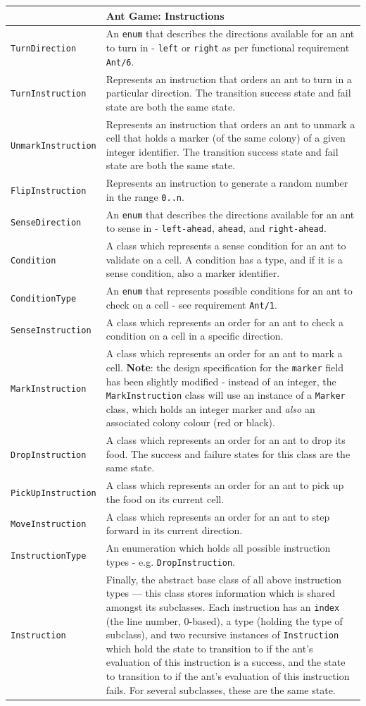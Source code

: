 \documentclass[11pt]{article}
\begin{document}
\begin{longtable}[c]{@{}p{}p{}@{}}
\toprule
& Ant Game: Instructions\tabularnewline
\midrule

\texttt{TurnDirection} & An \texttt{enum} that describes the directions available for an ant to turn in - \texttt{left} or \texttt{right} as per functional requirement \texttt{Ant/6}. \tabularnewline
\texttt{TurnInstruction} & Represents an instruction that orders an ant to turn in a particular direction. The transition success state and fail state are both the same state. \tabularnewline
\texttt{UnmarkInstruction} & Represents an instruction that orders an ant to unmark a cell that holds a marker (of the same colony) of a given integer identifier. The transition success state and fail state are both the same state. \tabularnewline
\texttt{FlipInstruction} & Represents an instruction to generate a random number in the range \texttt{0..n}. \tabularnewline
\texttt{SenseDirection} & An \texttt{enum} that describes the directions available for an ant to sense in - \texttt{left-ahead}, \texttt{ahead}, and \texttt{right-ahead}. \tabularnewline
\texttt{Condition} & A class which represents a sense condition for an ant to validate on a cell. A condition has a type, and if it is a sense condition, also a marker identifier. \tabularnewline
\texttt{ConditionType} & An \texttt{enum} that represents possible conditions for an ant to check on a cell - see requirement \texttt{Ant/1}. \tabularnewline
\texttt{SenseInstruction} & A class which represents an order for an ant to check a condition on a cell in a specific direction. \tabularnewline
\texttt{MarkInstruction} & A class which represents an order for an ant to mark a cell. \textbf{Note}: the design specification for the \texttt{marker} field has been slightly modified - instead of an integer, the \texttt{MarkInstruction} class will use an instance of a \texttt{Marker} class, which holds an integer marker and \textit{also} an associated colony colour (red or black). \tabularnewline
\texttt{DropInstruction} & A class which represents an order for an ant to drop its food. The success and failure states for this class are the same state. \tabularnewline
\texttt{PickUpInstruction} & A class which represents an order for an ant to pick up the food on its current cell. \tabularnewline
\texttt{MoveInstruction} & A class which represents an order for an ant to step forward in its current direction. \tabularnewline
\texttt{InstructionType} & An enumeration which holds all possible instruction types - e.g. \texttt{DropInstruction}. \tabularnewline
\texttt{Instruction} & Finally, the abstract base class of all above instruction types --- this class stores information which is shared amongst its subclasses. Each instruction has an \texttt{index} (the line number, $0$-based), a type (holding the type of subclass), and two recursive instances of \texttt{Instruction} which hold the state to transition to if the ant's evaluation of this instruction is a success, and the state to transition to if the ant's evaluation of this instruction fails. For several subclasses, these are the same state. \tabularnewline
\bottomrule
\end{longtable}
\end{document}
